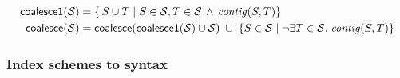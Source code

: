 \begin{align*}
  \mathsf{coalesce1}(\mathcal{S}) & =
                                    \{\,S \cup T \mid S \in \mathcal{S}, 
                                    T \in \mathcal{S} \, \wedge \,
                                    \mathit{contig}(S, T) \} \\
  \mathsf{coalesce}(\mathcal{S}) & =
                                   \mathsf{coalesce}(\mathsf{coalesce1}(\mathcal{S}) \cup \mathcal{S})
                                   \; \cup \;
                                   \{ S \in \mathcal{S} \mid \neg \exists T \in \mathcal{S} . \; \mathit{contig}(S, T)\}
\end{align*}

\subsubsection{Index schemes to syntax}
